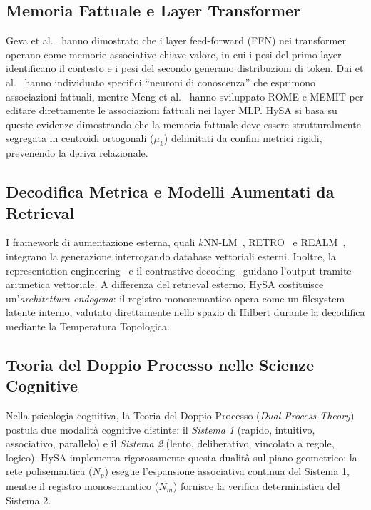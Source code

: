 \documentclass[11pt,a4paper]{article}
\theoremstyle{definition}
\begin{document}
\subsection{Memoria Fattuale e Layer Transformer}
Geva et al.~\cite{geva2021transformer} hanno dimostrato che i layer feed-forward (FFN) nei transformer operano come memorie associative chiave-valore, in cui i pesi del primo layer identificano il contesto e i pesi del secondo generano distribuzioni di token. Dai et al.~\cite{knowledge_neurons_2022} hanno individuato specifici ``neuroni di conoscenza'' che esprimono associazioni fattuali, mentre Meng et al.~\cite{meng2022locating_rome, meng2022mass_memit} hanno sviluppato ROME e MEMIT per editare direttamente le associazioni fattuali nei layer MLP. HySA si basa su queste evidenze dimostrando che la memoria fattuale deve essere strutturalmente segregata in centroidi ortogonali ($\mu_k$) delimitati da confini metrici rigidi, prevenendo la deriva relazionale.

\subsection{Decodifica Metrica e Modelli Aumentati da Retrieval}
I framework di aumentazione esterna, quali $k\text{NN}$-LM~\cite{khandelwal2020knn_lm}, RETRO~\cite{borgeaud2022retro} e REALM~\cite{guu2020realm}, integrano la generazione interrogando database vettoriali esterni. Inoltre, la representation engineering~\cite{zou2023representation} e il contrastive decoding~\cite{li2023contrastive} guidano l'output tramite aritmetica vettoriale. A differenza del retrieval esterno, HySA costituisce un'\textit{architettura endogena}: il registro monosemantico opera come un filesystem latente interno, valutato direttamente nello spazio di Hilbert durante la decodifica mediante la Temperatura Topologica.

\subsection{Teoria del Doppio Processo nelle Scienze Cognitive}
Nella psicologia cognitiva, la Teoria del Doppio Processo (\textit{Dual-Process Theory})~\cite{kahneman2011thinking, evans2008dual_process} postula due modalità cognitive distinte: il \textit{Sistema 1} (rapido, intuitivo, associativo, parallelo) e il \textit{Sistema 2} (lento, deliberativo, vincolato a regole, logico). HySA implementa rigorosamente questa dualità sul piano geometrico: la rete polisemantica ($N_p$) esegue l'espansione associativa continua del Sistema 1, mentre il registro monosemantico ($N_m$) fornisce la verifica deterministica del Sistema 2.
\end{document}
